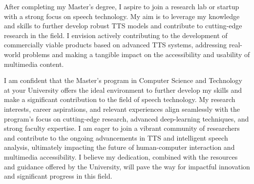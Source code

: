 \documentclass[12pt,a4paper]{article}
\begin{document}
\begin{CJK*}{UTF8}{gbsn}
After completing my Master's degree, I aspire to join a research lab or startup with a strong focus on speech technology. My aim is to leverage my knowledge and skills to further develop robust TTS models and contribute to cutting-edge research in the field. I envision actively contributing to the development of commercially viable products based on advanced TTS systems, addressing real-world problems and making a tangible impact on the accessibility and usability of multimedia content. \newline

I am confident that the Master's program in Computer Science and Technology at your University offers the ideal environment to further develop my skills and make a significant contribution to the field of speech technology. My research interests, career aspirations, and relevant experiences align seamlessly with the program's focus on cutting-edge research, advanced deep-learning techniques, and strong faculty expertise. I am eager to join a vibrant community of researchers and contribute to the ongoing advancements in TTS and intelligent speech analysis, ultimately impacting the future of human-computer interaction and multimedia accessibility. I believe my dedication, combined with the resources and guidance offered by the University, will pave the way for impactful innovation and significant progress in this field.




\end{CJK*}
\end{document}
